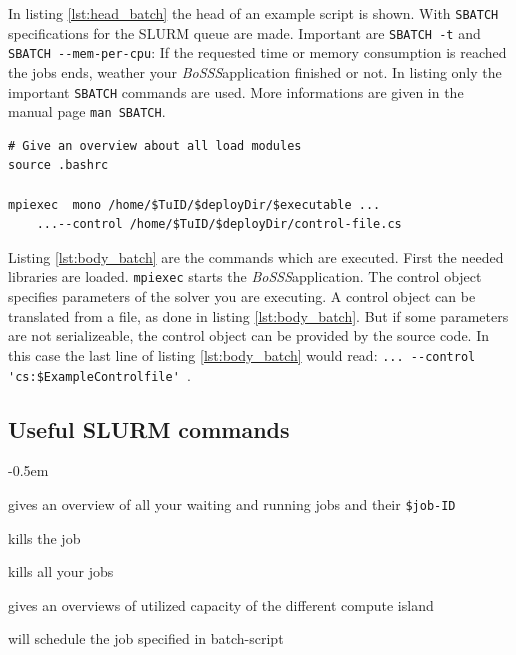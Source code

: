 \documentclass[11pt,twoside,a4paper]{fdyartcl}
\newcommand{\Bosss}{\textit{BoSSS}}
\begin{document}
In listing \ref{lst:head_batch} the head of an example script is shown. With \verb|SBATCH| specifications for the SLURM queue are made. Important are \verb|SBATCH -t| and \verb|SBATCH --mem-per-cpu|: If the requested time or memory consumption is reached the jobs ends, weather your \Bosss application finished or not. In listing only the important \verb|SBATCH| commands are used. More informations are given in the manual page \verb|man SBATCH|.

\noindent
\begin{minipage}{\linewidth}
\begin{lstlisting}[caption={Batch-script: body}, 
label={lst:body_batch}]
# Give an overview about all load modules
source .bashrc

mpiexec  mono /home/$TuID/$deployDir/$executable ...
	...--control /home/$TuID/$deployDir/control-file.cs
\end{lstlisting}
\end{minipage}

Listing \ref{lst:body_batch} are the commands which are executed. First the needed libraries are loaded. \verb|mpiexec| starts the \Bosss application. The control object specifies parameters of the solver you are executing. A control object can be translated from a file, as done in listing \ref{lst:body_batch}. But if some parameters are not serializeable, the control object can be provided by the source code. In this case the last line of listing \ref{lst:body_batch} would read: \verb|... --control 'cs:$ExampleControlfile' |.

\subsection{Useful SLURM commands}
\label{sec:lsf_commands}

\begin{description}
\itemsep-0.5em 
\item [sjobs] gives an overview of all your waiting and running jobs and their \verb|$job-ID|
\item [scancel job-ID] kills the job
\item [scancel -u \$TuID] kills all your jobs
\item [squeue] gives an overviews of utilized capacity of the different compute island
\item [sbatch batch.sh] will schedule the job specified in batch-script
\end{description}
\end{document}
